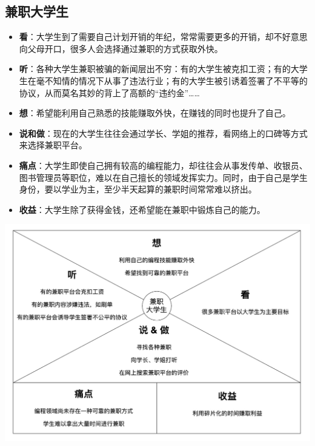\documentclass[a4paper]{ctexart}
\begin{document}
\subsection{兼职大学生}
\begin{itemize}
  \item \textbf{看}：大学生到了需要自己计划开销的年纪，常常需要更多的开销，却不好意思向父母开口，很多人会选择通过兼职的方式获取外快。
  \item \textbf{听}：各种大学生兼职被骗的新闻层出不穷：有的大学生被克扣工资；有的大学生在毫不知情的情况下从事了违法行业；有的大学生被引诱着签署了不平等的协议，从而莫名其妙的背上了高额的“违约金”……
  \item \textbf{想}：希望能利用自己熟悉的技能赚取外快，在赚钱的同时也提升了自己。
  \item \textbf{说和做}：现在的大学生往往会通过学长、学姐的推荐，看网络上的口碑等方式来选择兼职平台。
  \item \textbf{痛点}：大学生即使自己拥有较高的编程能力，却往往会从事发传单、收银员、图书管理员等职位，难以在自己擅长的领域发挥实力。同时，由于自己是学生身份，要以学业为主，至少半天起算的兼职时间常常难以挤出。
  \item \textbf{收益}：大学生除了获得金钱，还希望能在兼职中锻炼自己的能力。
\end{itemize}

\begin{center}
  \includegraphics[width=14cm]{兼职大学生.png}
\end{center}
\end{document}
